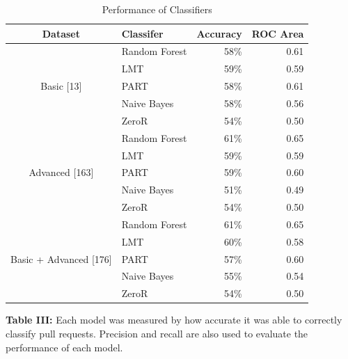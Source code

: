 \documentclass[10pt, conference]{IEEEtran}
\begin{document}
\begin{table}[h!]
  \centering
  \caption{Performance of Classifiers}
  \label{figureClassifers}
  \begin{tabular}{c|lrr}
    \hline
    \textbf {Dataset} & \textbf{Classifer} & \textbf{Accuracy} & \textbf{ROC Area}\\
    \hline
    \multirow{5}{*}{Basic [13]}
    				& \multicolumn{1}{l}{Random Forest} & \multicolumn{1}{r}{58\%} & \multicolumn{1}{r}{0.61} \\\cline{2-4}
                                 & \multicolumn{1}{l}{LMT} & \multicolumn{1}{r}{59\%} & \multicolumn{1}{r}{0.59} \\\cline{2-4}
                                 & \multicolumn{1}{l}{PART} & \multicolumn{1}{r}{58\%} & \multicolumn{1}{r}{0.61} \\\cline{2-4}
                                 & \multicolumn{1}{l}{Naive Bayes} & \multicolumn{1}{r}{58\%} & \multicolumn{1}{r}{0.56} \\\cline{2-4}
                                 & \multicolumn{1}{l}{ZeroR} & \multicolumn{1}{r}{54\%} & \multicolumn{1}{r}{0.50} \\\hline
    \multirow{5}{*}{Advanced [163]} 
    				& \multicolumn{1}{l}{Random Forest} & \multicolumn{1}{r}{61\%} & \multicolumn{1}{r}{0.65} \\\cline{2-4}
                                 & \multicolumn{1}{l}{LMT} & \multicolumn{1}{r}{59\%} & \multicolumn{1}{r}{0.59} \\\cline{2-4}
                                 & \multicolumn{1}{l}{PART} & \multicolumn{1}{r}{59\%} & \multicolumn{1}{r}{0.60} \\\cline{2-4}
                                 & \multicolumn{1}{l}{Naive Bayes} & \multicolumn{1}{r}{51\%} & \multicolumn{1}{r}{0.49} \\\cline{2-4}
                                 & \multicolumn{1}{l}{ZeroR} & \multicolumn{1}{r}{54\%} & \multicolumn{1}{r}{0.50} \\\hline
    \multirow{5}{*}{Basic + Advanced [176]} 
    				& \multicolumn{1}{l}{Random Forest} & \multicolumn{1}{r}{61\%} & \multicolumn{1}{r}{0.65} \\\cline{2-4}
                                 & \multicolumn{1}{l}{LMT} & \multicolumn{1}{r}{60\%} & \multicolumn{1}{r}{0.58} \\\cline{2-4}
                                 & \multicolumn{1}{l}{PART} & \multicolumn{1}{r}{57\%} & \multicolumn{1}{r}{0.60} \\\cline{2-4}
                                 & \multicolumn{1}{l}{Naive Bayes} & \multicolumn{1}{r}{55\%} & \multicolumn{1}{r}{0.54} \\\cline{2-4}
                                 & \multicolumn{1}{l}{ZeroR} & \multicolumn{1}{r}{54\%} & \multicolumn{1}{r}{0.50} \\\hline
  \end{tabular}
  \break
  \break
\textbf{Table III:} Each model was measured by how accurate it was able to correctly classify pull requests. Precision and recall are also used to evaluate the performance of each model.
\end{table}
\end{document}
